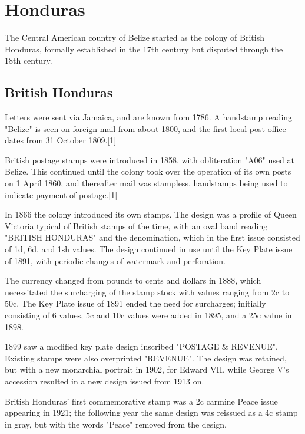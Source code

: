 
\section{Honduras}

The Central American country of Belize started as the colony of British Honduras, formally established in the 17th century but disputed through the 18th century.

\subsection{British Honduras}

Letters were sent via Jamaica, and are known from 1786. A handstamp reading "Belize" is seen on foreign mail from about 1800, and the first local post office dates from 31 October 1809.[1]

British postage stamps were introduced in 1858, with obliteration "A06" used at Belize. This continued until the colony took over the operation of its own posts on 1 April 1860, and thereafter mail was stampless, handstamps being used to indicate payment of postage.[1]


In 1866 the colony introduced its own stamps. The design was a profile of Queen Victoria typical of British stamps of the time, with an oval band reading "BRITISH HONDURAS" and the denomination, which in the first issue consisted of 1d, 6d, and 1sh values. The design continued in use until the Key Plate issue of 1891, with periodic changes of watermark and perforation.


The currency changed from pounds to cents and dollars in 1888, which necessitated the surcharging of the stamp stock with values ranging from 2c to 50c. The Key Plate issue of 1891 ended the need for surcharges; initially consisting of 6 values, 5c and 10c values were added in 1895, and a 25c value in 1898.

1899 saw a modified key plate design inscribed "POSTAGE & REVENUE". Existing stamps were also overprinted "REVENUE". The design was retained, but with a new monarchial portrait in 1902, for Edward VII, while George V's accession resulted in a new design issued from 1913 on.

British Honduras' first commemorative stamp was a 2c carmine Peace issue appearing in 1921; the following year the same design was reissued as a 4c stamp in gray, but with the words "Peace" removed from the design.


